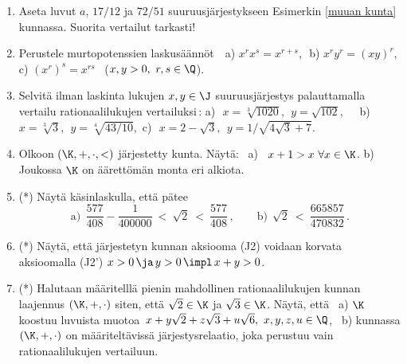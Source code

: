 \begin{enumerate}
\item
Aseta luvut $a$, $17/12$ ja $72/51$ suuruusjärjestykseen Esimerkin \ref{muuan kunta} kunnassa.
Suorita vertailut tarkasti!

\item \label{H-I-2: murtopotenssit}
Perustele murtopotenssien laskusäännöt \,\ a) $x^rx^s=x^{r+s}$,\,\ b) $x^ry^r=(xy)^r$,
c) $(x^r)^s=x^{rs}$ \ ($x,y>0,\ r,s\in\Q$).

\item
Selvitä ilman laskinta lukujen $x,y\in\J$ suuruusjärjestys palauttamalla vertailu
rationaalilukujen vertailuksi\,:\vspace{1mm}\newline 
a)\,\ $x=\sqrt[3]{1020},\ \ y=\sqrt{102}, \quad$
b)\,\ $x=\sqrt[3]{3},\ \ y=\sqrt[4]{43/10},$\vspace{1mm}\newline
c)\,\ $x=2-\sqrt{3},\ \ y=1/\sqrt{4\sqrt{3}+7}.$

\item
Olkoon $(\K,+,\cdot,<)$ järjestetty kunta. Näytä: \ a) \ $x+1>x\ \forall x\in\K$. \newline
b) Joukossa $\K$ on äärettömän monta eri alkiota. 

\item (*)
Näytä käsinlaskulla, että pätee
\[
\text{a)}\ \ \frac{577}{408}-\frac{1}{400000}\ <\ \sqrt{2}\ <\ \frac{577}{408}\,, \qquad
\text{b)}\ \ \sqrt{2}\ <\ \frac{665857}{470832}\,.
\]

\item (*)
Näytä, että järjestetyn kunnan aksiooma (J2) voidaan korvata aksioomalla
(J2') $x>0 \,\ja\, y>0 \,\impl\, x+y>0$.

\item (*)
Halutaan määritelllä pienin mahdollinen rationaalilukujen kunnan laajennus $(\K,+,\cdot)$ siten,
että $\sqrt{2}\in\K$ ja $\sqrt{3}\in\K$. Näytä, että \ a) $\K$ koostuu luvuista muotoa
$\,x+y\sqrt{2}+z\sqrt{3}+u\sqrt{6},\ x,y,z,u\in\Q$, \ b) kunnassa $(\K,+,\cdot)$ on
määriteltävissä järjestysrelaatio, joka perustuu vain rationaalilukujen vertailuun.


\end{enumerate}
